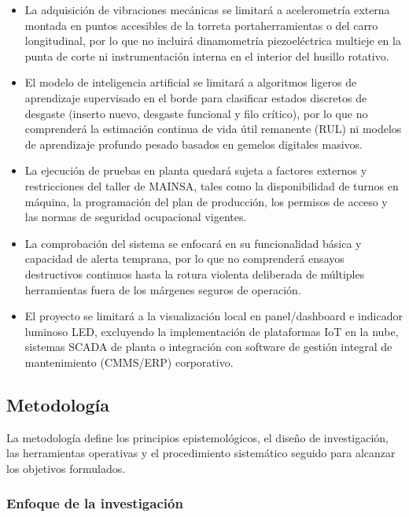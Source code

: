 \begin{itemize}
\item La adquisición de vibraciones mecánicas se limitará a acelerometría externa montada en puntos accesibles de la torreta portaherramientas o del carro longitudinal, por lo que no incluirá dinamometría piezoeléctrica multieje en la punta de corte ni instrumentación interna en el interior del husillo rotativo.
\item El modelo de inteligencia artificial se limitará a algoritmos ligeros de aprendizaje supervisado en el borde para clasificar estados discretos de desgaste (inserto nuevo, desgaste funcional y filo crítico), por lo que no comprenderá la estimación continua de vida útil remanente (RUL) ni modelos de aprendizaje profundo pesado basados en gemelos digitales masivos.
\item La ejecución de pruebas en planta quedará sujeta a factores externos y restricciones del taller de MAINSA, tales como la disponibilidad de turnos en máquina, la programación del plan de producción, los permisos de acceso y las normas de seguridad ocupacional vigentes.
\item La comprobación del sistema se enfocará en su funcionalidad básica y capacidad de alerta temprana, por lo que no comprenderá ensayos destructivos continuos hasta la rotura violenta deliberada de múltiples herramientas fuera de los márgenes seguros de operación.
\item El proyecto se limitará a la visualización local en panel/dashboard e indicador luminoso LED, excluyendo la implementación de plataformas IoT en la nube, sistemas SCADA de planta o integración con software de gestión integral de mantenimiento (CMMS/ERP) corporativo.
\end{itemize}

\subsection{Metodología}
\label{subsec:metodologia}

La metodología define los principios epistemológicos, el diseño de investigación, las herramientas operativas y el procedimiento sistemático seguido para alcanzar los objetivos formulados.

\subsubsection{Enfoque de la investigación}
\label{subsubsec:enfoque_investigacion}


